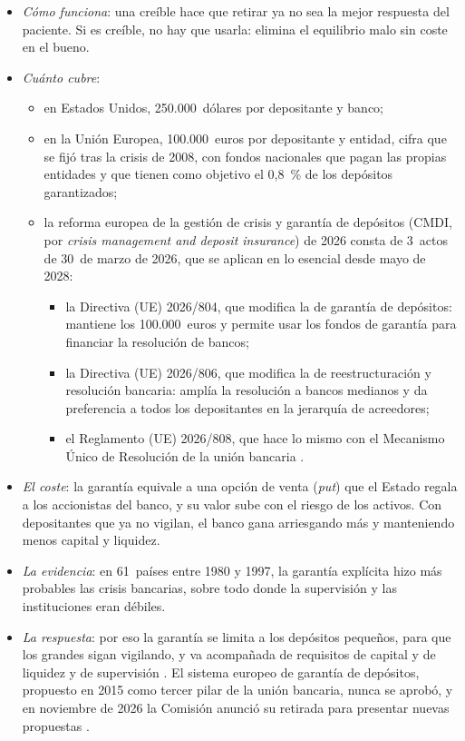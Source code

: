\documentclass[11pt]{article}
\begin{document}
\begin{itemize}
\item \emph{Cómo funciona}: una  creíble hace que retirar ya no sea la mejor respuesta del paciente. Si es creíble, no hay que usarla: elimina el equilibrio malo sin coste en el bueno\nocite{DiamondDybvig1983Bank}.
\item \emph{Cuánto cubre}:
  \begin{itemize}
  \item en Estados Unidos, 250.000~dólares por depositante y banco\nocite{FDIC2026Insurance};
  \item en la Unión Europea, 100.000~euros por depositante y entidad, cifra que se fijó tras la crisis de 2008, con fondos nacionales que pagan las propias entidades y que tienen como objetivo el 0,8~\% de los depósitos garantizados\nocite{UE2014DGSD,UE2009Dir14,FGD2026Garantia};
  \item la reforma europea de la gestión de crisis y garantía de depósitos (CMDI, por \emph{crisis management and deposit insurance}) de 2026 consta de 3~actos de 30~de marzo de 2026, que se aplican en lo esencial desde mayo de 2028\nocite{UE2026Dir804,UE2026Dir806,UE2026Reg808}:
    \begin{itemize}
    \item la Directiva (UE) 2026/804, que modifica la de garantía de depósitos: mantiene los 100.000~euros y permite usar los fondos de garantía para financiar la resolución de bancos\nocite{UE2026Dir804};
    \item la Directiva (UE) 2026/806, que modifica la de reestructuración y resolución bancaria: amplía la resolución a bancos medianos y da preferencia a todos los depositantes en la jerarquía de acreedores\nocite{UE2026Dir806};
    \item el Reglamento (UE) 2026/808, que hace lo mismo con el Mecanismo Único de Resolución de la unión bancaria\nocite{UE2026Reg808}  .
    \end{itemize}
  \end{itemize}
\item \emph{El coste}: la garantía equivale a una opción de venta (\emph{put}) que el Estado regala a los accionistas del banco, y su valor sube con el riesgo de los activos\nocite{Merton1977Analytic}. Con depositantes que ya no vigilan, el banco gana arriesgando más y manteniendo menos capital y liquidez.
\item \emph{La evidencia}: en 61~países entre 1980 y 1997, la garantía explícita hizo más probables las crisis bancarias, sobre todo donde la supervisión y las instituciones eran débiles\nocite{DemirgucKuntDetragiache2002}.
\item \emph{La respuesta}: por eso la garantía se limita a los depósitos pequeños, para que los grandes sigan vigilando, y va acompañada de requisitos de capital y de liquidez y de supervisión . El sistema europeo de garantía de depósitos, propuesto en 2015 como tercer pilar de la unión bancaria, nunca se aprobó, y en noviembre de 2026 la Comisión anunció su retirada para presentar nuevas propuestas\nocite{CE2015EDIS} .
\end{itemize}
\end{document}

